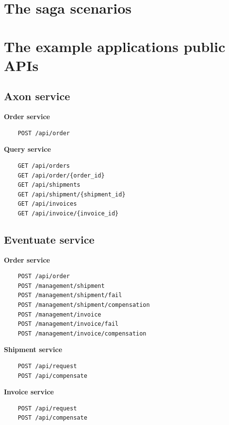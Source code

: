 \documentclass[oneside,
  digital, %
  table,   %
  nolof,     %
  nolot,     %
]{fithesis3}
\begin{document}
\chapter{The saga scenarios}
\label{sec:appendix-scenarios}

\chapter{The example applications public APIs}
\label{sec:appendixAPI}

\section{Axon service}

\textbf{Order service}

\begin{verbatim}
    POST /api/order
\end{verbatim}

\noindent
\textbf{Query service}

\begin{verbatim}
    GET /api/orders
    GET /api/order/{order_id}
    GET /api/shipments
    GET /api/shipment/{shipment_id}
    GET /api/invoices
    GET /api/invoice/{invoice_id}
\end{verbatim}

\section{Eventuate service}

\textbf{Order service}

\begin{verbatim}
    POST /api/order
    POST /management/shipment
    POST /management/shipment/fail
    POST /management/shipment/compensation
    POST /management/invoice
    POST /management/invoice/fail
    POST /management/invoice/compensation
\end{verbatim}

\noindent
\textbf{Shipment service}

\begin{verbatim}
    POST /api/request
    POST /api/compensate
\end{verbatim}

\noindent
\textbf{Invoice service}

\begin{verbatim}
    POST /api/request
    POST /api/compensate
\end{verbatim}
\end{document}
